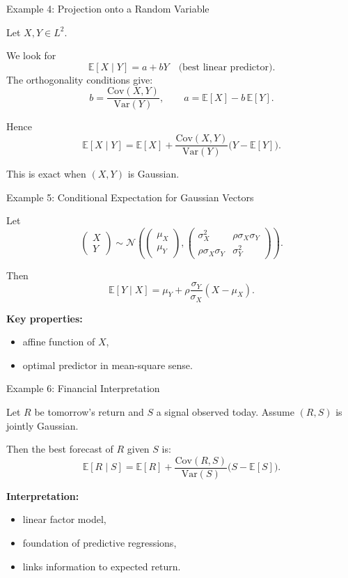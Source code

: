 \documentclass[aspectratio=169]{beamer}
\begin{document}
\begin{frame}{Example 4: Projection onto a Random Variable}

Let \(X,Y\in L^2\).

We look for
\[
\mathbb{E}[X\mid Y]
=
a+bY
\quad\text{(best linear predictor)}.
\]\pause
The orthogonality conditions give:
\[
b=\frac{\mathrm{Cov}(X,Y)}{\mathrm{Var}(Y)},
\qquad
a=\mathbb{E}[X]-b\,\mathbb{E}[Y].
\]\pause

Hence
\[
\mathbb{E}[X\mid Y]
=
\mathbb{E}[X]
+
\frac{\mathrm{Cov}(X,Y)}{\mathrm{Var}(Y)}
\big(Y-\mathbb{E}[Y]\big).
\]
\pause
\medskip

This is exact when \((X,Y)\) is Gaussian.

\end{frame}

\begin{frame}{Example 5: Conditional Expectation for Gaussian Vectors}

Let
\[
\begin{pmatrix} X \\ Y \end{pmatrix}
\sim
\mathcal{N}\!\left(
\begin{pmatrix} \mu_X \\ \mu_Y \end{pmatrix},
\begin{pmatrix}
\sigma_X^2 & \rho\sigma_X\sigma_Y \\
\rho\sigma_X\sigma_Y & \sigma_Y^2
\end{pmatrix}
\right).
\]\pause

\medskip

Then
\[
\mathbb{E}[Y\mid X]
=
\mu_Y
+
\rho\frac{\sigma_Y}{\sigma_X}(X-\mu_X).
\]
\pause
\medskip

\textbf{Key properties:}
\begin{itemize}
  \item affine function of \(X\),
  \item optimal predictor in mean-square sense.
\end{itemize}

\end{frame}

\begin{frame}{Example 6: Financial Interpretation}

Let \(R\) be tomorrow's return and \(S\) a signal observed today.
\pause
Assume \((R,S)\) is jointly Gaussian.
\pause
\medskip

Then the best forecast of \(R\) given \(S\) is:
\[
\mathbb{E}[R\mid S]
=
\mathbb{E}[R]
+
\frac{\mathrm{Cov}(R,S)}{\mathrm{Var}(S)}
\big(S-\mathbb{E}[S]\big).
\]\pause

\medskip

\textbf{Interpretation:}
\begin{itemize}
  \item linear factor model,\pause
  \item foundation of predictive regressions,\pause
  \item links information to expected return.
\end{itemize}

\end{frame}
\end{document}
